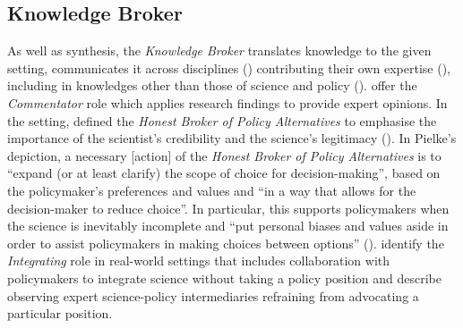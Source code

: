 \subsection{Knowledge Broker}
As well as synthesis, the \emph{Knowledge Broker} translates knowledge to the given setting, communicates it across disciplines (\cite{GogginEtAl2015}) contributing their own expertise (\cite{RapleyD2014}), including in knowledges other than those of science and policy (\cite{Gluckman2014}). \textcite{KarkkainenLKK2024} offer the \emph{Commentator} role which applies research findings to provide expert opinions. In the \SPI{} setting, \textcite{Pielke2007} defined the \emph{Honest Broker of Policy Alternatives} to emphasise the importance of the scientist's credibility and the science's legitimacy (\cite{DuncanRE2020}). In Pielke's depiction, a necessary [action] of the \emph{Honest Broker of Policy Alternatives} is to ``expand (or at least clarify) the scope of choice for decision-making'', based on the policymaker's preferences and values and ``in a way that allows for the decision-maker to reduce choice''. In particular, this supports policymakers when the science is inevitably incomplete and ``put personal biases and values aside in order to assist policymakers in making choices between options'' (\cite{GluckmanBK2021}). \textcite{SteelLLS2004,SinghTKMMC2014} identify the \emph{Integrating} role in real-world settings that includes collaboration with policymakers to integrate science without taking a policy position and \textcite{BednarekSHG2015} describe observing expert science-policy intermediaries refraining from advocating a particular position.

